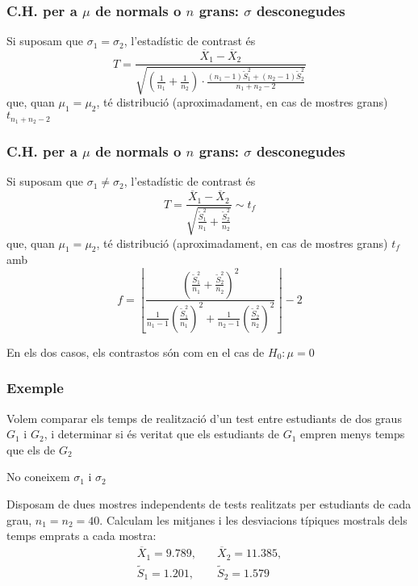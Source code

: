 \documentclass[12pt,t]{beamer}\usepackage[]{graphicx}\usepackage[]{color}
\theoremstyle{plain}
\theoremstyle{definition}
\begin{document}
\begin{frame}
\frametitle{C.H. per a $\mu$ de normals o $n$ grans: $\sigma$ desconegudes}

Si suposam que $\sigma_1=\sigma_2$, l'estadístic de contrast és
$$
T=\frac{\overline{X}_1-\overline{X}_2}%
{\sqrt{(\frac{1}{n_1}+\frac{1}{n_2})\cdot 
\frac{(n_1-1)\widetilde{S}_1^2+(n_2-1)\widetilde{S}_2^2}%
{n_1+n_2-2}}}
$$
que, quan $\mu_1=\mu_2$, té distribució (aproximadament, en cas de mostres grans) $t_{n_1+n_2-2}$
\end{frame}


\begin{frame}
\frametitle{C.H. per a $\mu$ de normals o $n$ grans: $\sigma$ desconegudes}
\vspace*{-3ex}

Si suposam que $\sigma_1\neq \sigma_2$, l'estadístic de contrast és
$$
T=\frac{\overline{X}_1-\overline{X}_2}{\sqrt{\frac{\widetilde{S}_1^2}{n_1}+\frac{\widetilde{S}_2^2}{n_2}}}\sim t_f
$$
que, quan $\mu_1=\mu_2$, té distribució (aproximadament, en cas de mostres grans) $t_{f}$ amb
$$
f=\left\lfloor\frac{\displaystyle \left( \frac{\widetilde{S}_1^2}{n_1}+\frac{\widetilde{S}_2^2}{n_2}\right)^2}%
{\displaystyle \frac{1}{n_1-1}\left(\frac{\widetilde{S}_1^2}{n_1}\right)^2+\frac{1}{n_2-1}\left(\frac{\widetilde{S}_2^2}{n_2}\right)^2}\right\rfloor -2
$$



En els dos casos, els contrastos són com en el cas de $H_0:\mu=0$
\end{frame}

\begin{frame}
\frametitle{Exemple}

Volem comparar els temps de realització d'un test entre estudiants de dos graus $G_1$ i $G_2$, i determinar si és veritat que els estudiants de $G_1$ empren menys temps que els de $G_2$
\medskip

No coneixem $\sigma_1$ i $\sigma_2$
\medskip


Disposam de dues mostres independents  de tests realitzats per estudiants de cada grau, $n_1=n_2=40$. Calculam les mitjanes i les desviacions típiques
mostrals dels temps emprats a cada mostra:
$$
\begin{array}{ll}
\overline{X}_1= 9.789,&\quad  \overline{X}_2=11.385,\\[1ex]
\widetilde{S}_1=1.201,&\quad \widetilde{S}_2=1.579
\end{array}
$$
\end{frame}
\end{document}
